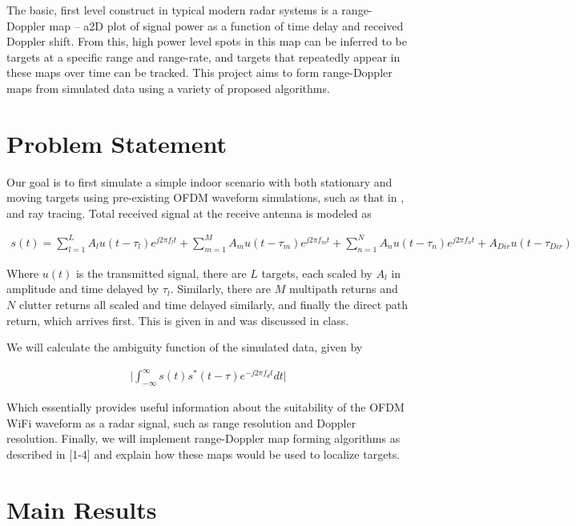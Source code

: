 \documentclass[article,11pt,onecolumn,final]{IEEEtran}
\begin{document}
The basic, first level construct in typical modern radar systems is a range-Doppler map – a2D plot of
signal power as a function of time delay and received Doppler shift. From this, high power level spots in
this map can be inferred to be targets at a specific range and range-rate, and targets that repeatedly
appear in these maps over time can be tracked. This project aims to form range-Doppler maps from
simulated data using a variety of proposed algorithms.

\section{Problem Statement} 
Our goal is to first simulate a simple indoor scenario with both stationary and moving targets using 
pre-existing OFDM waveform simulations, such as that in \cite{Hemple}, and ray tracing. Total received signal at the
receive antenna is modeled as

\begin{align*}
 s(t) = \sum_{l=1}^L A_l u(t-\tau_l)e^{j 2 \pi f_l t} + \sum_{m=1}^M A_m u(t-\tau_m)e^{j 2\pi f_m t} +
        \sum_{n=1}^N A_n u(t-\tau_n)e^{j 2 \pi f_n t} + A_{Dir} u(t-\tau_{Dir})
\end{align*}

Where $u(t)$ is the transmitted signal, there are $L$ targets, each scaled by $A_l$ in amplitude and time
delayed by $\tau_l$. Similarly, there are $M$ multipath returns and $N$ clutter returns all scaled and time delayed
similarly, and finally the direct path return, which arrives first. This is given in \cite{Chetty} and was discussed in
class.

We will calculate the ambiguity function of the simulated data, given by

\begin{align*}
\big|\int_{-\infty}^{\infty} s(t)s^*(t-\tau)e^{-j2\pi f_d t}dt \big|
\end{align*}

Which essentially provides useful information about the suitability of the OFDM WiFi waveform as a
radar signal, such as range resolution and Doppler resolution. Finally, we will implement range-Doppler
map forming algorithms as described in [1-4] and explain how these maps would be used to localize
targets.


\section{Main Results}
\end{document}
